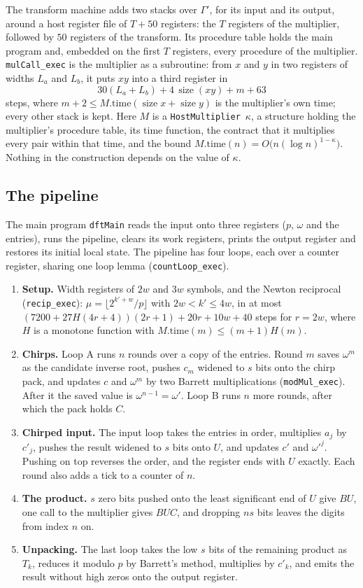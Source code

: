 \documentclass[11pt]{amsart}
\newcommand{\size}{\operatorname{size}}
\newcommand{\lean}[1]{\texttt{#1}}
\begin{document}
The transform machine adds two stacks over $\Gamma'$, for its input and its output, around a
host register file of $T + 50$ registers: the $T$ registers of the multiplier, followed by $50$
registers of the transform. Its procedure table holds the main program and, embedded on the
first $T$ registers, every procedure of the multiplier. \lean{mulCall\_exec} is the
multiplier as a subroutine: from $x$ and $y$ in two registers of widths $L_a$ and $L_b$, it
puts $xy$ into a third register in
\[
  30(L_a + L_b) + 4\,\size(xy) + m + 63
\]
steps, where $m + 2 \le M.\mathrm{time}(\size x + \size y)$ is the multiplier's own time; every
other stack is kept. Here $M$ is a \lean{HostMultiplier}~$\kappa$, a structure holding the
multiplier's procedure table, its time function, the contract that it multiplies every pair
within that time, and the bound $M.\mathrm{time}(n) = O\bigl(n (\log n)^{1-\kappa}\bigr)$.
Nothing in the construction depends on the value of $\kappa$.

\subsection{The pipeline}
The main program \lean{dftMain} reads the input onto three registers ($p$, $\omega$ and the
entries), runs the pipeline, clears its work registers, prints the output register and
restores its initial local state. The pipeline has four loops, each over a counter register,
sharing one loop lemma (\lean{countLoop\_exec}).

\begin{enumerate}
\item \textbf{Setup.} Width registers of $2w$ and $3w$ symbols, and the Newton reciprocal
  (\lean{recip\_exec}): $\mu = \lfloor 2^{k'+w}/p \rfloor$ with $2w < k' \le 4w$, in at most
  $(7200 + 27 H(4r+4))(2r+1) + 20r + 10w + 40$ steps for $r = 2w$, where $H$ is a monotone
  function with $M.\mathrm{time}(m) \le (m+1) H(m)$.
\item \textbf{Chirps.} Loop A runs $n$ rounds over a copy of the entries. Round $m$ saves
  $\omega^m$ as the candidate inverse root, pushes $c_m$ widened to $s$ bits onto the chirp
  pack, and updates $c$ and $\omega^m$ by two Barrett multiplications (\lean{modMul\_exec}).
  After it the saved value is $\omega^{n-1} = \omega'$. Loop B runs $n$ more rounds, after
  which the pack holds $C$.
\item \textbf{Chirped input.} The input loop takes the entries in order, multiplies $a_j$ by
  $c'_j$, pushes the result widened to $s$ bits onto $U$, and updates $c'$ and $\omega'^j$.
  Pushing on top reverses the order, and the register ends with $U$ exactly. Each round also
  adds a tick to a counter of $n$.
\item \textbf{The product.} $s$ zero bits pushed onto the least significant end of $U$ give
  $BU$, one call to the multiplier gives $BUC$, and dropping $ns$ bits leaves the digits from
  index $n$ on.
\item \textbf{Unpacking.} The last loop takes the low $s$ bits of the remaining product as
  $T_k$, reduces it modulo $p$ by Barrett's method, multiplies by $c'_k$, and emits the result
  without high zeros onto the output register.
\end{enumerate}
\end{document}
